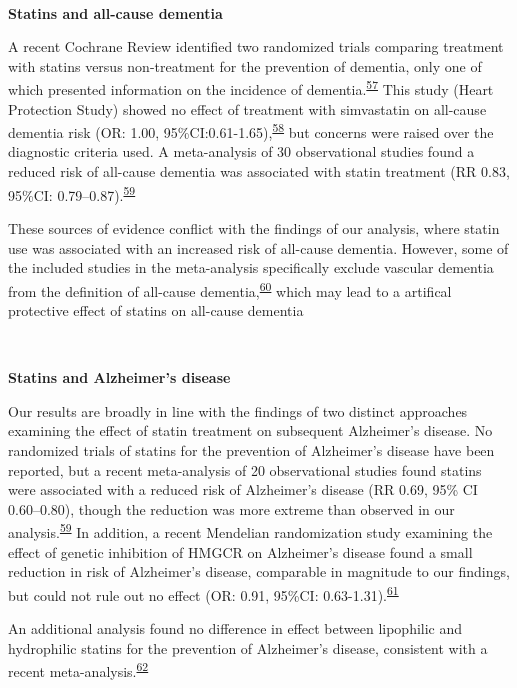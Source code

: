 \documentclass[a4paper, twoside]{templates/ociamthesis}
\begin{document}
~

\textbf{Statins and all-cause dementia}

A recent Cochrane Review identified two randomized trials comparing treatment with statins versus non-treatment for the prevention of dementia, only one of which presented information on the incidence of dementia.\textsuperscript{\protect\hyperlink{ref-mcguinness2016a}{57}} This study (Heart Protection Study) showed no effect of treatment with simvastatin on all-cause dementia risk (OR: 1.00, 95\%CI:0.61-1.65),\textsuperscript{\protect\hyperlink{ref-heartprotectionstudycollaborativegroup2002}{58}} but concerns were raised over the diagnostic criteria used. A meta-analysis of 30 observational studies found a reduced risk of all-cause dementia was associated with statin treatment (RR 0.83, 95\%CI: 0.79--0.87).\textsuperscript{\protect\hyperlink{ref-poly2020}{59}}

These sources of evidence conflict with the findings of our analysis, where statin use was associated with an increased risk of all-cause dementia. However, some of the included studies in the meta-analysis specifically exclude vascular dementia from the definition of all-cause dementia,\textsuperscript{\protect\hyperlink{ref-chao2015}{60}} which may lead to a artifical protective effect of statins on all-cause dementia

~

\textbf{Statins and Alzheimer's disease}

Our results are broadly in line with the findings of two distinct approaches examining the effect of statin treatment on subsequent Alzheimer's disease. No randomized trials of statins for the prevention of Alzheimer's disease have been reported, but a recent meta-analysis of 20 observational studies found statins were associated with a reduced risk of Alzheimer's disease (RR 0.69, 95\% CI 0.60--0.80), though the reduction was more extreme than observed in our analysis.\textsuperscript{\protect\hyperlink{ref-poly2020}{59}} In addition, a recent Mendelian randomization study examining the effect of genetic inhibition of HMGCR on Alzheimer's disease found a small reduction in risk of Alzheimer's disease, comparable in magnitude to our findings, but could not rule out no effect (OR: 0.91, 95\%CI: 0.63-1.31).\textsuperscript{\protect\hyperlink{ref-williams}{61}}

An additional analysis found no difference in effect between lipophilic and hydrophilic statins for the prevention of Alzheimer's disease, consistent with a recent meta-analysis.\textsuperscript{\protect\hyperlink{ref-chu2018}{62}}
\end{document}
